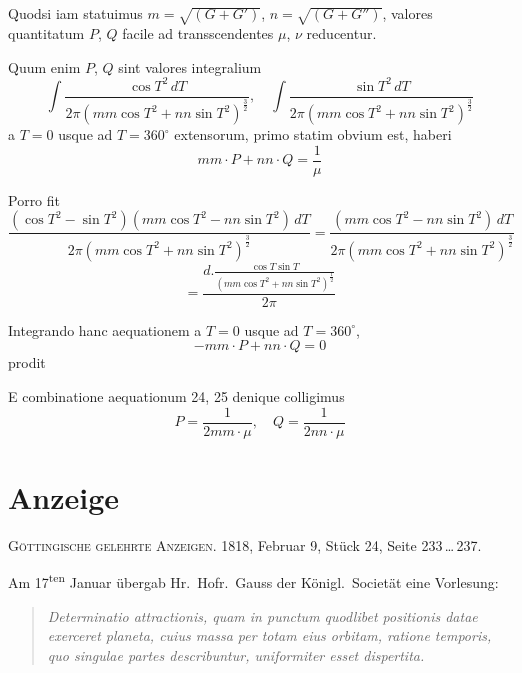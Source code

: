 \documentclass[12pt,a4paper]{article}
\begin{document}
\setcounter{subsection}{19}
\subsection{}

Quodsi iam statuimus $m = \sqrt{(G+G')}$, $n = \sqrt{(G+G'')}$, valores quantitatum $P$, $Q$ facile ad transscendentes $\mu$, $\nu$ reducentur.

Quum enim $P$, $Q$ sint valores integralium
\[
\int\frac{\cos T^2\,dT}{2\pi(mm\cos T^2 + nn\sin T^2)^{\frac{3}{2}}}, \quad
\int\frac{\sin T^2\,dT}{2\pi(mm\cos T^2 + nn\sin T^2)^{\frac{3}{2}}}
\]
a $T=0$ usque ad $T=360^{\circ}$ extensorum, primo statim obvium est, haberi
\[
mm\cdot P + nn\cdot Q = \frac{1}{\mu}
\tag{24}
\]

Porro fit
\[
\frac{(\cos T^2 - \sin T^2)(mm\cos T^2 - nn\sin T^2)\,dT}{2\pi(mm\cos T^2 + nn\sin T^2)^{\frac{3}{2}}}
= \frac{(mm\cos T^2 - nn\sin T^2)\,dT}{2\pi(mm\cos T^2 + nn\sin T^2)^{\frac{3}{2}}}
\]
\[
= \frac{d.\frac{\cos T\sin T}{(mm\cos T^2 + nn\sin T^2)^{\frac{1}{2}}}}{2\pi}
\]

Integrando hanc aequationem a $T=0$ usque ad $T=360^{\circ}$,
\[
-mm\cdot P + nn\cdot Q = 0
\tag{25}
\]
prodit

E combinatione aequationum 24, 25 denique colligimus
\[
P = \frac{1}{2mm\cdot\mu}, \quad Q = \frac{1}{2nn\cdot\mu}
\]

\newpage
\section*{Anzeige}

\textsc{G\"ottingische gelehrte Anzeigen.} 1818, Februar 9, St\"uck 24, Seite 233\,\dots\,237.

Am 17\textsuperscript{ten} Januar \"ubergab Hr.\ Hofr.\ Gauss der K\"onigl.\ Societ\"at eine Vorlesung:
\begin{quote}
\textit{Determinatio attractionis, quam in punctum quodlibet positionis datae exerceret planeta, cuius massa per totam eius orbitam, ratione temporis, quo singulae partes describuntur, uniformiter esset dispertita.}
\end{quote}
\end{document}
